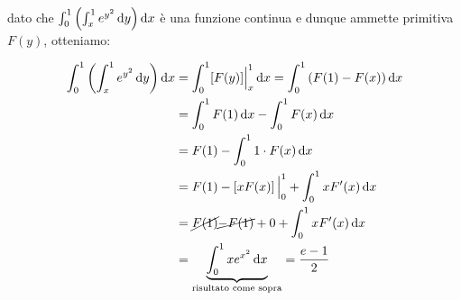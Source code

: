 dato che \(\int_{0}^{1} \left(\int_{x}^{1} e ^{y^{2}} \mathop{}\!\mathrm{d}{y} \right) \mathop{}\!\mathrm{d}{x} \) è una funzione continua e dunque ammette primitiva \(F(y)\), otteniamo:

\begin{align*}
    \int_{0}^{1} {\left(\int_{x}^{1} e ^{y^{2}} \diff{y} \right)} \diff{x} & = \int_{0}^{1} \EvalCustom{[F(y)]}{x}{1}{\Big} \diff{x} = \int_{0}^{1} \left(F(1) - F(x) \right) \diff{x} \\
                                                                           & = \int_{0}^{1} F(1) \diff{x} - \int_{0}^{1} F(x) \diff{x}                                                 \\
                                                                           & = F(1) - \int_{0}^{1} 1 \cdot F(x) \diff{x}                                                               \\
                                                                           & = F(1) - \EvalCustom{\left[ xF(x) \right]}{0}{1}{\Big} + \int_{0}^{1} x F'(x) \diff{x}                    \\
                                                                           & = \cancel{F(1)} \cancel{- F(1)} + 0 + \int_{0}^{1} xF'(x) \diff{x}                                        \\
                                                                           & = \underbrace{\int_{0}^{1} x e^{x^{2}} \diff{x} }_\text{risultato come sopra} = \frac{e-1}{2}
\end{align*}
